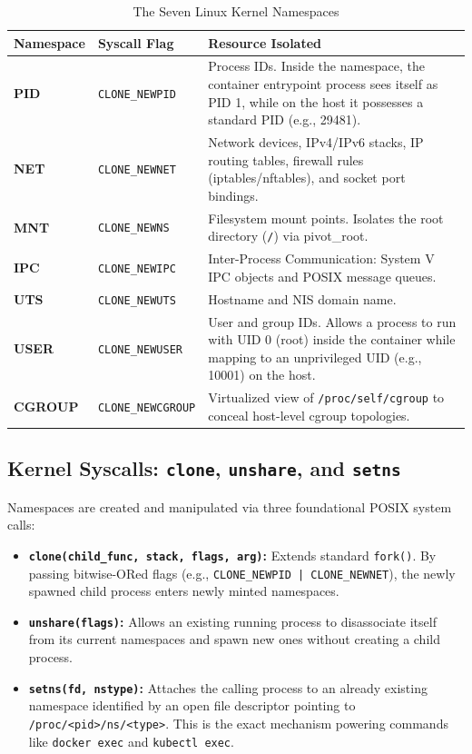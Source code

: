 \begin{table}[htbp]
\centering\small
\begin{tabular}{llp{7.5cm}}
\toprule
\textbf{Namespace} & \textbf{Syscall Flag} & \textbf{Resource Isolated} \\
\midrule
\textbf{PID} & \texttt{CLONE\_NEWPID} & Process IDs. Inside the namespace, the container entrypoint process sees itself as PID 1, while on the host it possesses a standard PID (e.g., 29481). \\
\textbf{NET} & \texttt{CLONE\_NEWNET} & Network devices, IPv4/IPv6 stacks, IP routing tables, firewall rules (iptables/nftables), and socket port bindings. \\
\textbf{MNT} & \texttt{CLONE\_NEWNS} & Filesystem mount points. Isolates the root directory (\texttt{/}) via pivot\_root. \\
\textbf{IPC} & \texttt{CLONE\_NEWIPC} & Inter-Process Communication: System V IPC objects and POSIX message queues. \\
\textbf{UTS} & \texttt{CLONE\_NEWUTS} & Hostname and NIS domain name. \\
\textbf{USER} & \texttt{CLONE\_NEWUSER} & User and group IDs. Allows a process to run with UID 0 (root) inside the container while mapping to an unprivileged UID (e.g., 10001) on the host. \\
\textbf{CGROUP} & \texttt{CLONE\_NEWCGROUP} & Virtualized view of \texttt{/proc/self/cgroup} to conceal host-level cgroup topologies. \\
\bottomrule
\end{tabular}
\caption{The Seven Linux Kernel Namespaces}
\label{tab:linux-namespaces}
\end{table}

\subsection{Kernel Syscalls: \texttt{clone}, \texttt{unshare}, and \texttt{setns}}
Namespaces are created and manipulated via three foundational POSIX system calls:
\begin{itemize}[leftmargin=12pt]
  \item \textbf{\texttt{clone(child\_func, stack, flags, arg)}:} Extends standard \texttt{fork()}. By passing bitwise-ORed flags (e.g., \texttt{CLONE\_NEWPID | CLONE\_NEWNET}), the newly spawned child process enters newly minted namespaces.
  \item \textbf{\texttt{unshare(flags)}:} Allows an existing running process to disassociate itself from its current namespaces and spawn new ones without creating a child process.
  \item \textbf{\texttt{setns(fd, nstype)}:} Attaches the calling process to an already existing namespace identified by an open file descriptor pointing to \texttt{/proc/<pid>/ns/<type>}. This is the exact mechanism powering commands like \texttt{docker exec} and \texttt{kubectl exec}.
\end{itemize}

